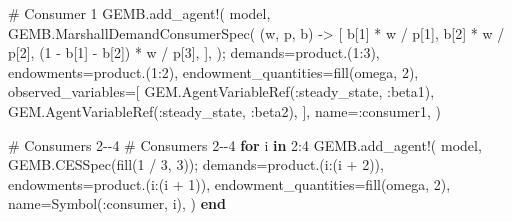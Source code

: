 \documentclass[
  letterpaper,
  DIV=11,
  numbers=noendperiod]{scrreprt}
\newenvironment{Shaded}{\begin{snugshade}}{\end{snugshade}}
\newcommand{\CommentTok}[1]{\textcolor[rgb]{0.37,0.37,0.37}{#1}}
\newcommand{\ControlFlowTok}[1]{\textcolor[rgb]{0.00,0.23,0.31}{\textbf{#1}}}
\newcommand{\FloatTok}[1]{\textcolor[rgb]{0.68,0.00,0.00}{#1}}
\newcommand{\FunctionTok}[1]{\textcolor[rgb]{0.28,0.35,0.67}{#1}}
\newcommand{\KeywordTok}[1]{\textcolor[rgb]{0.00,0.23,0.31}{\textbf{#1}}}
\newcommand{\NormalTok}[1]{\textcolor[rgb]{0.00,0.23,0.31}{#1}}
\newcommand{\OperatorTok}[1]{\textcolor[rgb]{0.37,0.37,0.37}{#1}}
\begin{document}
\begin{codelisting}
{\begin{Shaded}
\begin{Highlighting}[]
    \CommentTok{\# Consumer 1}
\NormalTok{    GEMB.}\FunctionTok{add\_agent!}\NormalTok{(}
\NormalTok{        model,}
\NormalTok{        GEMB.}\FunctionTok{MarshallDemandConsumerSpec}\NormalTok{(}
\NormalTok{            (w, p, b) }\OperatorTok{{-}\textgreater{}}\NormalTok{ [}
\NormalTok{                b[}\FloatTok{1}\NormalTok{] }\OperatorTok{*}\NormalTok{ w }\OperatorTok{/}\NormalTok{ p[}\FloatTok{1}\NormalTok{],}
\NormalTok{                b[}\FloatTok{2}\NormalTok{] }\OperatorTok{*}\NormalTok{ w }\OperatorTok{/}\NormalTok{ p[}\FloatTok{2}\NormalTok{],}
\NormalTok{                (}\FloatTok{1} \OperatorTok{{-}}\NormalTok{ b[}\FloatTok{1}\NormalTok{] }\OperatorTok{{-}}\NormalTok{ b[}\FloatTok{2}\NormalTok{]) }\OperatorTok{*}\NormalTok{ w }\OperatorTok{/}\NormalTok{ p[}\FloatTok{3}\NormalTok{],}
\NormalTok{            ],}
\NormalTok{        );}
\NormalTok{        demands}\OperatorTok{=}\FunctionTok{product}\NormalTok{.(}\FloatTok{1}\OperatorTok{:}\FloatTok{3}\NormalTok{),}
\NormalTok{        endowments}\OperatorTok{=}\FunctionTok{product}\NormalTok{.(}\FloatTok{1}\OperatorTok{:}\FloatTok{2}\NormalTok{),}
\NormalTok{        endowment\_quantities}\OperatorTok{=}\FunctionTok{fill}\NormalTok{(omega, }\FloatTok{2}\NormalTok{),}
\NormalTok{        observed\_variables}\OperatorTok{=}\NormalTok{[}
\NormalTok{            GEM.}\FunctionTok{AgentVariableRef}\NormalTok{(}\OperatorTok{:}\NormalTok{steady\_state, }\OperatorTok{:}\NormalTok{beta1),}
\NormalTok{            GEM.}\FunctionTok{AgentVariableRef}\NormalTok{(}\OperatorTok{:}\NormalTok{steady\_state, }\OperatorTok{:}\NormalTok{beta2),}
\NormalTok{        ],}
\NormalTok{        name}\OperatorTok{=:}\NormalTok{consumer1,}
\NormalTok{    )}

    \CommentTok{\# Consumers 2{-}{-}4}
\CommentTok{\# Consumers 2{-}{-}4}
\ControlFlowTok{for}\NormalTok{ i }\KeywordTok{in} \FloatTok{2}\OperatorTok{:}\FloatTok{4}
\NormalTok{    GEMB.}\FunctionTok{add\_agent!}\NormalTok{(}
\NormalTok{        model,}
\NormalTok{        GEMB.}\FunctionTok{CESSpec}\NormalTok{(}\FunctionTok{fill}\NormalTok{(}\FloatTok{1} \OperatorTok{/} \FloatTok{3}\NormalTok{, }\FloatTok{3}\NormalTok{));}
\NormalTok{        demands}\OperatorTok{=}\FunctionTok{product}\NormalTok{.(i}\OperatorTok{:}\NormalTok{(i }\OperatorTok{+} \FloatTok{2}\NormalTok{)),}
\NormalTok{        endowments}\OperatorTok{=}\FunctionTok{product}\NormalTok{.(i}\OperatorTok{:}\NormalTok{(i }\OperatorTok{+} \FloatTok{1}\NormalTok{)),}
\NormalTok{        endowment\_quantities}\OperatorTok{=}\FunctionTok{fill}\NormalTok{(omega, }\FloatTok{2}\NormalTok{),}
\NormalTok{        name}\OperatorTok{=}\FunctionTok{Symbol}\NormalTok{(}\OperatorTok{:}\NormalTok{consumer, i),}
\NormalTok{    )}
\ControlFlowTok{end}


\end{Highlighting}
\end{Shaded}}
\end{codelisting}
\end{document}
